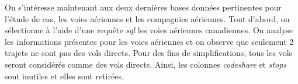 \documentclass{report}
\begin{document}
On s'intéresse maintenant aux deux dernières bases données pertinentes pour l'étude de cas, les voies aériennes et les compagnies aériennes. Tout d'abord, on sélectionne à l'aide d'une requête \textit{sql} les voies aériennes canadiennes. On analyse les informations présentes pour les voies aériennes et on observe que seulement 2 trajets ne sont pas des vols directs. Pour des fins de simplifications, tous les vols seront considérés comme des vols directs. Ainsi, les colonnes \textit{codeshare} et \textit{stops} sont inutiles et elles sont retirées.
\end{document}
